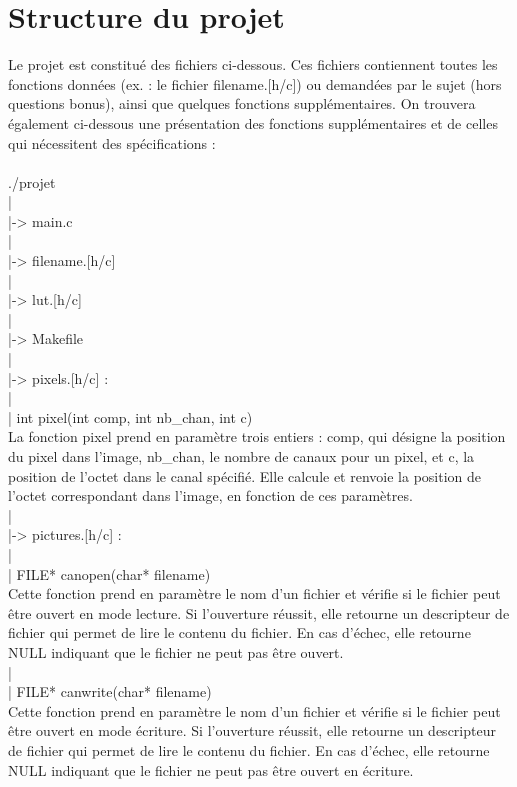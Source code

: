 \documentclass[12pt,a4paper]{article}
\begin{document}
\section{Structure du projet}
Le projet est constitué des fichiers ci-dessous. Ces fichiers contiennent toutes les fonctions données (ex. : le fichier filename.[h/c]) ou demandées par le sujet (hors questions bonus), ainsi que quelques fonctions supplémentaires. On trouvera également ci-dessous une présentation des fonctions supplémentaires et de celles qui nécessitent des spécifications : \\ 
\\
./projet\\
|\\
|-> main.c \\
|\\
|-> filename.[h/c]\\
|\\
|-> lut.[h/c]\\
|\\
|-> Makefile\\
|\\
|-> pixels.[h/c] : \\
|\\
| int pixel(int comp, int nb\_chan, int c)\\
La fonction pixel prend en paramètre trois entiers : comp, qui désigne la position du pixel dans l'image, nb\_chan, le nombre de canaux pour un pixel, et c, la position de l'octet dans le canal spécifié. Elle calcule et renvoie la position de l'octet correspondant dans l'image, en fonction de ces paramètres.\\
|\\
|-> pictures.[h/c] : \\
|\\
| FILE* canopen(char* filename)\\
Cette fonction prend en paramètre le nom d'un fichier et vérifie si le fichier peut être ouvert en mode lecture. Si l'ouverture réussit, elle retourne un descripteur de fichier qui permet de lire le contenu du fichier. En cas d'échec, elle retourne NULL indiquant que le fichier ne peut pas être ouvert.\\
|\\
| FILE* canwrite(char* filename)\\
Cette fonction prend en paramètre le nom d'un fichier et vérifie si le fichier peut être ouvert en mode écriture. Si l'ouverture réussit, elle retourne un descripteur de fichier qui permet de lire le contenu du fichier. En cas d'échec, elle retourne NULL indiquant que le fichier ne peut pas être ouvert en écriture.\\
\end{document}
